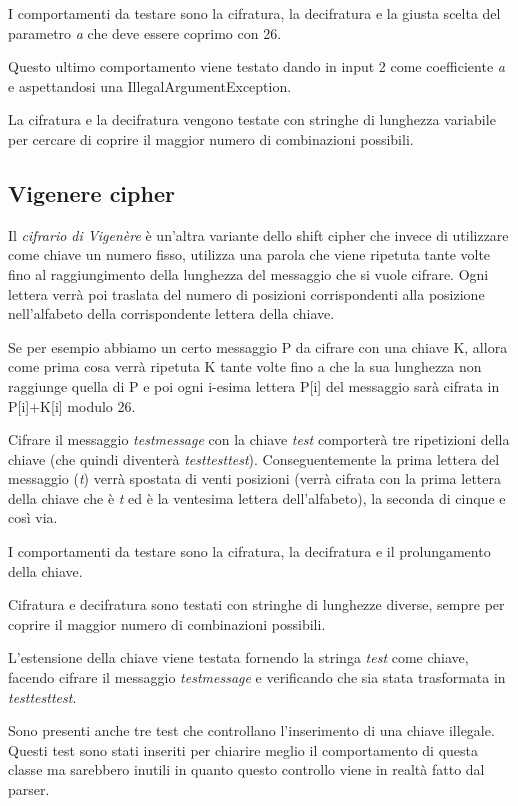 			I comportamenti da testare sono la cifratura, la decifratura e la giusta scelta del  parametro \emph{a} che deve essere coprimo con 26.
			
			Questo ultimo comportamento viene testato dando in input 2 come coefficiente \emph{a} e aspettandosi una IllegalArgumentException.
			
			La cifratura e la decifratura vengono testate con stringhe di lunghezza variabile per cercare di coprire il maggior numero di combinazioni possibili.
			
		\subsection{Vigenere cipher}
			Il \emph{cifrario di Vigenère} è un'altra variante dello shift cipher che invece di utilizzare come chiave un numero fisso, utilizza una parola che viene ripetuta tante volte fino al raggiungimento della lunghezza del messaggio che si vuole cifrare. Ogni lettera verrà poi traslata del numero di posizioni corrispondenti alla posizione nell'alfabeto della corrispondente lettera della chiave.
			
			Se per esempio abbiamo un certo messaggio P da cifrare con una chiave K, allora come prima cosa verrà ripetuta K tante volte fino a che la sua lunghezza non raggiunge quella di P e poi ogni i-esima lettera P[i] del messaggio sarà cifrata in P[i]+K[i] modulo 26.
			
			Cifrare il messaggio \emph{testmessage} con la chiave \emph{test} comporterà tre ripetizioni della chiave (che quindi diventerà \emph{testtesttest}). Conseguentemente la prima lettera del messaggio (\emph{t}) verrà spostata di venti posizioni (verrà cifrata con la prima lettera della chiave che è \emph{t} ed è la ventesima lettera dell'alfabeto), la seconda di cinque e così via.
			
			I comportamenti da testare sono la cifratura, la decifratura e il prolungamento della chiave.
			
			Cifratura e decifratura sono testati con stringhe di lunghezze diverse, sempre per coprire il maggior numero di combinazioni possibili.
			
			L'estensione della chiave viene testata fornendo la stringa \emph{test} come chiave, facendo cifrare il messaggio \emph{testmessage} e verificando che sia stata trasformata in \emph{testtesttest}.
			
			Sono presenti anche tre test che controllano l'inserimento di una chiave illegale. Questi test sono stati inseriti per chiarire meglio il comportamento di questa classe ma sarebbero inutili in quanto questo controllo viene in realtà fatto dal parser.
			
